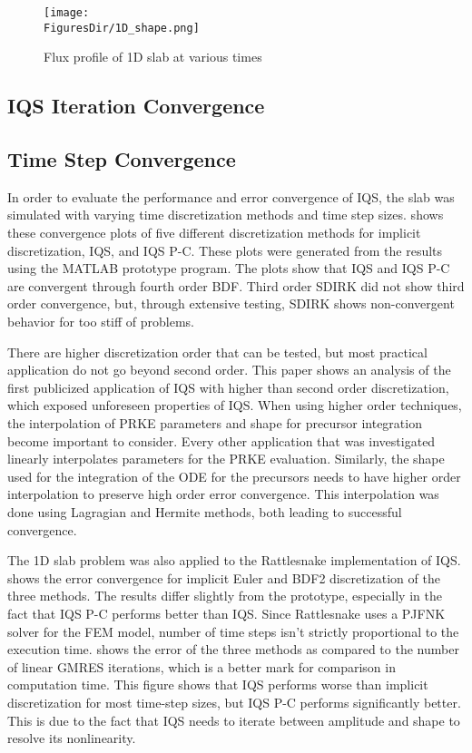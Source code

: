 \begin{figure}[!htbp]
\begin{center}
\texttt{[image: \\FiguresDir/1D\_shape.png]}
\caption{Flux profile of 1D slab at various times}
\label{fig:1D_shape}
\end{center}
\end{figure}

\subsection{IQS Iteration Convergence}

\subsection{Time Step Convergence}

In order to evaluate the performance and error convergence of IQS, the slab was simulated with varying time discretization methods and time step sizes.   shows these convergence plots of five different discretization methods for implicit discretization, IQS, and IQS P-C.  These plots were generated from the results using the MATLAB prototype program.  The plots show that IQS and IQS P-C are convergent through fourth order BDF.  Third order SDIRK did not show third order convergence, but, through extensive testing, SDIRK shows non-convergent behavior for too stiff of problems.  

There are higher discretization order that can be tested, but most practical application do not go beyond second order.  This paper shows an analysis of the first publicized application of IQS with higher than second order discretization, which exposed unforeseen properties of IQS.  When using higher order techniques, the interpolation of PRKE parameters and shape for precursor integration become important to consider.  Every other application that was investigated linearly interpolates parameters for the PRKE evaluation.  Similarly, the shape used for the integration of the ODE for the precursors needs to have higher order interpolation to preserve high order error convergence.  This interpolation was done using Lagragian and Hermite methods, both leading to successful convergence.

The 1D slab problem was also applied to the Rattlesnake implementation of IQS.   shows the error convergence for implicit Euler and BDF2 discretization of the three methods.  The results differ slightly from the prototype, especially in the fact that IQS P-C performs better than IQS.  Since Rattlesnake uses a PJFNK solver for the FEM model, number of time steps isn't strictly proportional to the execution time.   shows the error of the three methods as compared to the number of linear GMRES iterations, which is a better mark for comparison in computation time.  This figure shows that IQS performs worse than implicit discretization for most time-step sizes, but IQS P-C performs significantly better.  This is due to the fact that IQS needs to iterate between amplitude and shape to resolve its nonlinearity.


